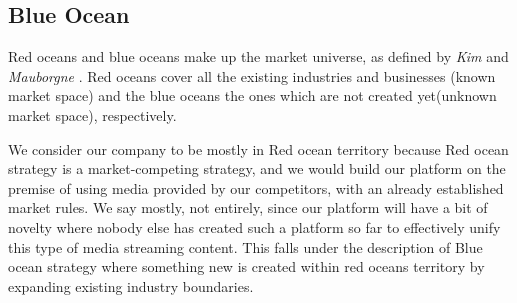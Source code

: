 \subsection{Blue Ocean}

Red oceans and blue oceans make up the market universe, as defined by \textit{Kim} and \textit{Mauborgne} \cite{Blue_ocean_strategy}. Red oceans cover all the existing industries and businesses (known market space) and the blue oceans the ones which are not created yet(unknown market space), respectively.

We consider our company to be mostly in Red ocean territory because Red ocean strategy is a market-competing strategy, and we would build our platform on the premise of using media provided by our competitors, with an already established market rules. We say mostly, not entirely, since our platform will have a bit of novelty where nobody else  has created such a platform so far to effectively unify this type of media streaming content. This falls under the description of Blue ocean strategy where something new is created within red oceans territory by expanding existing industry boundaries.